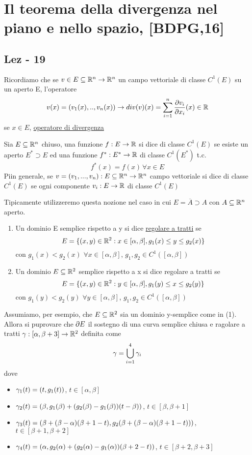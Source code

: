 \chapter{Il teorema della divergenza nel piano e nello spazio, [BDPG,16]}
\section{Lez - 19}
Ricordiamo che se $v\in E\subseteq\mathbb{R}^n\to\mathbb{R}^n$ \ace un campo vettoriale di classe $C^1(E)$
su un aperto E, l'operatore
$$v(x) = \left(v_1(x),..,v_n(x)\right) \to div(v)(x) = \sum_{i=1}^{n} \frac{\partial v_i}{\partial x_i} (x) \in \mathbb{R}$$
se $x\in E$, \underline{operatore di divergenza}
\begin{definition}
  Sia $E\subseteq\mathbb{R}^n$ chiuso, una funzione $f:E\to\mathbb{R}$ si dice di classe $C^1(E)$ se esiste 
  un aperto $E^*\supset E$ ed una funzione $f^* : E^* \to \mathbb{R}$ di classe $C^1(E^*)$ t.c.
  $$f^*(x) = f(x) \, \forall x\in E$$
  Pi\acu in generale, se $v = (v_1,...,v_n) : E \subseteq \mathbb{R}^n \to \mathbb{R}^n$ campo vettoriale
  si dice di classe $C^1(E)$ se ogni componente
  $v_i : E \to \mathbb{R}$ \ace di classe $C^1(E)$
\end{definition}
\begin{osservazione}
  Tipicamente utilizzeremo questa nozione nel caso in cui $E = \overline{A} \supset A$ con 
  $A\subseteq \mathbb{R}^n$ aperto.
\end{osservazione}
\begin{definition}
  \begin{enumerate}
    \item Un dominio E semplice rispetto a y si dice \underline{regolare a tratti} se 
          $$E = \{(x,y)\in\mathbb{R}^2 : x\in[\alpha,\beta], g_1(x)\leq y \leq g_2(x)\}$$
          con $g_1(x) < g_2(x)$ $\forall x \in [\alpha,\beta]$, $g_1,g_2\in C^1([\alpha,\beta])$
    \item Un dominio $E\subseteq \mathbb{R}^2$ semplice rispetto a x si dice regolare a tratti se 
          $$E = \{(x,y)\in\mathbb{R}^2 : y\in[\alpha,\beta], g_1(y)\leq x \leq g_2(y)\}$$
          con $g_1(y) < g_2(y)$ $\forall y \in [\alpha,\beta]$, $g_1,g_2\in C^1([\alpha,\beta])$
  \end{enumerate}
\end{definition}
Assumiamo, per esempio, che $E\subseteq\mathbb{R}^2$ sia un dominio y-semplice come in (1). Allora si pu\aco provare che 
$\partial E$ \ace il sostegno di una curva semplice chiusa e ragolare a tratti 
$\gamma : [\alpha,\beta+3] \to \mathbb{R}^2$ definita come 
$$\gamma = \bigcup_{i=1}^{4} \gamma_i$$
dove 
\begin{itemize}
  \item $\gamma_1(t)=(t,g_1(t))$, $t\in[\alpha,\beta]$
  \item $\gamma_2(t)=(\beta,g_1(\beta)+(g_2(\beta)-g_1(\beta))(t-\beta))$, $t\in[\beta, \beta+1]$
  \item $\gamma_3(t)=(\beta+(\beta-\alpha)(\beta+1-t),g_2(\beta+(\beta-\alpha)(\beta+1-t)))$, $t\in[\beta+1,\beta+2]$
  \item $\gamma_4(t)=(\alpha, g_2(\alpha)+ (g_2(\alpha)-g_1(\alpha))(\beta+2-t))$, $t\in[\beta+2,\beta+3]$
\end{itemize}
